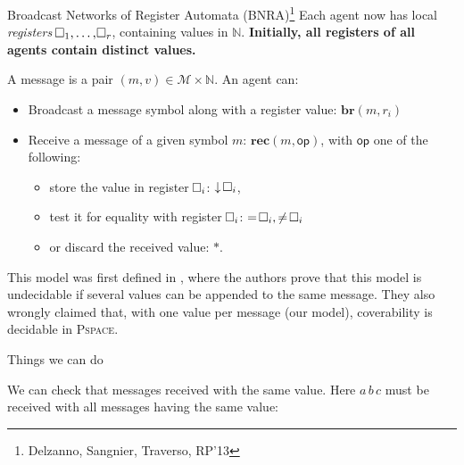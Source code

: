 \documentclass{beamer}
\newcommand{\messages}{\mathcal{M}}
\newcommand{\reg}{\hspace{-0.5mm}\square}
\begin{document}
\begin{frame}{Broadcast Networks of Register Automata (BNRA)\footnote{Delzanno, Sangnier, Traverso, RP'13}}
	Each agent now has local \emph{registers} $\reg_1, \ldots, \reg_r$, containing values in $\mathbb{N}$.
	\pause
	\textbf{Initially, all registers of all agents contain distinct values.}
	
	\pause
	\vspace{0.2cm}
	A message is a pair $(m, v) \in \messages \times \mathbb{N}$.
	An agent can:
	\begin{itemize}
		\item Broadcast a message symbol along with a register value: $\mathbf{br}(m, r_i)$\vspace{0.3cm}\pause
		
		
		\item Receive a message of a given symbol $m$: $\mathbf{rec}(m, \mathsf{op})$, with $\mathsf{op}$ one of the following:
		\begin{itemize}
			\item store the value in register $\reg_i$: $\downarrow \reg_i$,
			
			\item test it for equality with register $\reg_i$: $= \reg_i, \neq \reg_i$
			
			\item or discard the received value: $*$.
		\end{itemize}   
	\end{itemize}

	\pause
	This model was first defined in \footnotemark[3], where the authors prove that this model is undecidable if several values can be appended to the same message. They also wrongly claimed that, with one value per message (our model), coverability is decidable in \textsc{Pspace}.
\end{frame}

\begin{frame}{Things we can do}
	
	We can check that messages received with the same value.
	Here $a \, b \, c$ must be received with all messages having the same value: 
	\vspace{1cm}


	\centering
	
\end{frame}
\end{document}
